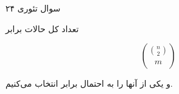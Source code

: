 سوال تئوری ۲۴

تعداد کل حالات برابر 


$$
\binom{\binom{n}{2}}{m}
$$


و یکی از آنها را به احتمال برابر انتخاب می‌کنیم.